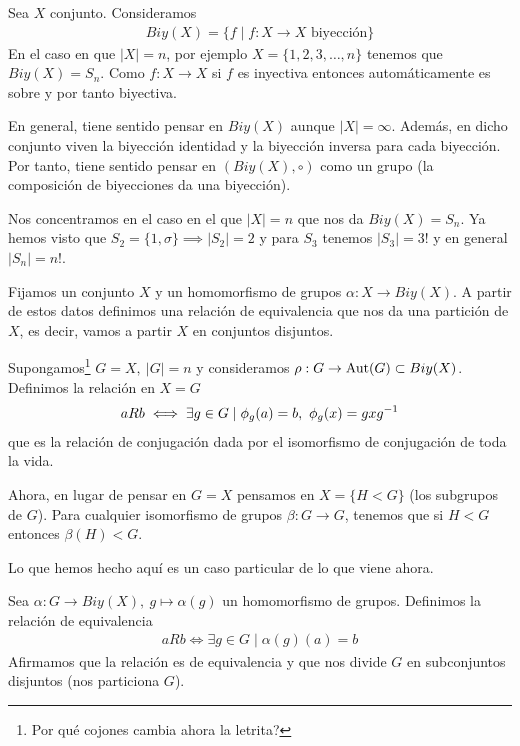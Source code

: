 \hr

Sea $X$ conjunto. Consideramos
\begin{align*}
Biy(X) = \{f \mid f: X \to X \text{ biyección}\}
\end{align*}
En el caso en que $|X| = n$, por ejemplo $X = \{1, 2, 3, \dots, n\}$ tenemos que $Biy(X) = S_n$. Como $f:X \to X$ si $f$ es inyectiva entonces automáticamente es sobre y por tanto biyectiva.

En general, tiene sentido pensar en $Biy(X)$ aunque $|X| = \infty$. Además, en dicho conjunto viven la biyección identidad y la biyección inversa para cada biyección. Por tanto, tiene sentido pensar en $(Biy(X), \circ)$ como un grupo (la composición de biyecciones da una biyección).

Nos concentramos en el caso en el que $|X| = n$ que nos da $Biy(X) = S_n$. Ya hemos visto que $S_2 = \{1, \sigma\} \implies |S_2| = 2$ y para $S_3$ tenemos $|S_3| = 3!$ y en general $|S_n| = n!$.

Fijamos un conjunto $X$ y un homomorfismo de grupos $\alpha: X \to Biy(X)$. A partir de estos datos definimos una relación de equivalencia que nos da una partición de $X$, es decir, vamos a partir $X$ en conjuntos disjuntos.

\begin{ej}
	Supongamos\footnote{Por qué cojones cambia ahora la letrita?} $G = X,\ |G| = n$ y consideramos $\rho: G \to \text{Aut}(G) \subset Biy(X)$. Definimos la relación en $X = G$
	\begin{align*}
	aRb \iff \exists g \in G \mid \phi_g(a) = b,\ \phi_g(x) = gxg^{-1}
	\end{align*}
	que es la relación de conjugación dada por el isomorfismo de conjugación de toda la vida.
	
	Ahora, en lugar de pensar en $G = X$ pensamos en $X = \{H < G\}$ (los subgrupos de $G$). Para cualquier isomorfismo de grupos $\beta: G \to G$, tenemos que si $H < G$ entonces $\beta(H) < G$.
	
	Lo que hemos hecho aquí es un caso particular de lo que viene ahora.
\end{ej}

\begin{pro}
	Sea $\alpha: G \to Biy(X),\ g \mapsto \alpha(g)$ un homomorfismo de grupos. Definimos la relación de equivalencia
	\begin{align}
	aRb \iff \exists g \in G \mid \alpha(g)(a) = b
	\end{align}
	Afirmamos que la relación es de equivalencia y que nos divide $G$ en subconjuntos disjuntos (nos particiona $G$).
\end{pro}

